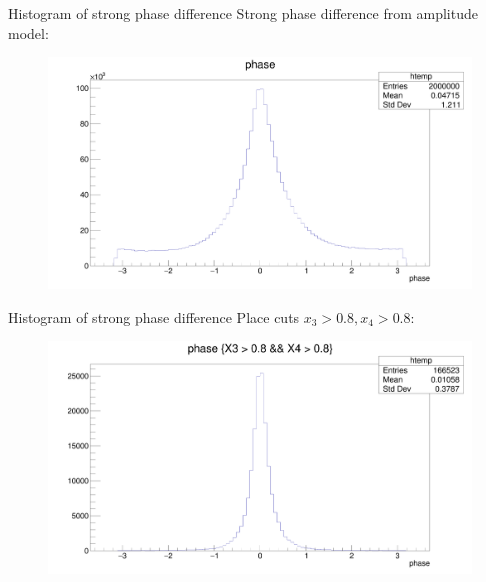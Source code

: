 \documentclass{beamer}
\begin{document}
\begin{frame}{Histogram of strong phase difference}
  Strong phase difference from amplitude model:
  \begin{figure}
    \includegraphics[width = 1\textwidth]{strongphase.png}
  \end{figure}
\end{frame}

\begin{frame}{Histogram of strong phase difference}
  Place cuts $x_3 > 0.8, x_4 > 0.8$:
  \begin{figure}
    \includegraphics[width = 1\textwidth]{strongphasecut.png}
  \end{figure}
\end{frame}
\end{document}
